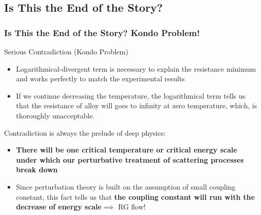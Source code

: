 \documentclass[10pt,aspectratio=43,xcolor=x11names,t]{beamer}%
\begin{document}
	\subsection{Is This the End of the Story?}
		\begin{frame}\frametitle{Is This the End of the Story? Kondo Problem!}
			\begin{redblock}{Serious Contradiction (Kondo Problem)}
				\begin{itemize}
					\item Logarithmical-divergent term is necessary to explain the resistance minimum and works perfectly to match the experimental results
					\item If we continue decreasing the temperature, the logarithmical term tells us that the resistance of alloy will goes to infinity at zero temperature, which, is thoroughly unacceptable.
				\end{itemize}
			\end{redblock}
			\pause
			Contradiction is always the prelude of deep physics:
			\pause
			\begin{itemize}
				\item {\color{blue}\textbf{There will be one critical temperature or critical energy scale under which our perturbative treatment of scattering processes break down}}
				\item Since perturbation theory is built on the assumption of small coupling constant, this fact tells us that {\color{blue}\textbf{the coupling constant will run with the decrease of energy scale}}$\implies$ RG flow!
			\end{itemize}
		\end{frame}
\end{document}
